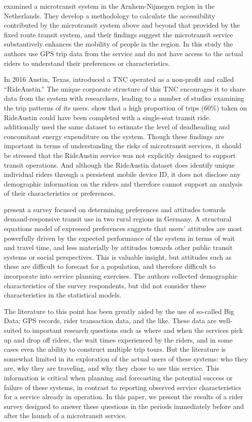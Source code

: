 \documentclass[smartcities,article,submit,moreauthors,pdftex]{mdpi}
\begin{document}
\citet{alonso2018} examined a microtransit system in the Arnhem-Nijmegen region in the
Netherlands. They develop a methodology to calculate the accessibility
contributed by the microtransit system above and beyond that provided by the
fixed route transit system, and their findings suggest the microtransit
service substantively enhances the mobility of people in the region. In this
study the authors use GPS trip data from the service and do not have access to
the actual riders to understand their preferences or characteristics.

In 2016 Austin, Texas, introduced a TNC operated as a non-profit and called
``RideAustin.'' The unique corporate structure of this TNC encourages it to share
data from the system with researchers, leading to a number of studies examining
the trip patterns of its users. \citet{Komanduri2018} show that a high proportion of
trips (60\%) taken on RideAustin could have been completed with a single-seat
transit ride. \citet{Wenzel2019} additionally used the same dataset to estimate the
level of deadheading and concomitant energy expenditure on the system. Though
these findings are important in terms of understanding the risks of microtransit
services, it should be stressed that the RideAustin service was not explicitly designed
to support transit operations. And although the RideAustin dataset does identify
unique individual riders through a persistent mobile device ID, it does not
disclose any demographic information on the riders and therefore cannot support
an analysis of their characteristics or preferences.

\citet{KONIG2020954} present a survey focused on determining preferences and
attitudes towards demand-responsive transit use in two rural regions in
Germany. A structural equations model of expressed preferences suggests that
users' attitudes are most powerfully driven by the expected performance of the
system in terms of wait and travel time, and less materially by attitudes
towards other public transit systems or social perspectives. This is valuable
insight, but attitudes such as these are difficult to forecast for a population,
and therefore difficult to incorporate into service planning exercises. The
authors collected demographic characteristics of the survey respondents, but did
not consider these characteristics in the statistical models.

The literature to this point has been greatly aided by the use of so-called Big
Data: GPS records, rider transaction data, and the like. These data are
well-suited to important research questions such as where and when the services
pick up and drop off riders, the wait times experienced by the riders, and in
some cases even the ability to construct multiple trip tours. But the literature
is somewhat limited in its exploration of the actual users of
these systems: who they are, why they are traveling, and why they chose to use
this service. This information is critical when planning and forecasting the
potential success or failure of these systems, in contrast to reporting observed
service characteristics for a service already in operation. In this paper, we
present the results of a rider survey designed to answer these questions in the
periods immediately before and after the launch of a
microtransit service.
\end{document}
